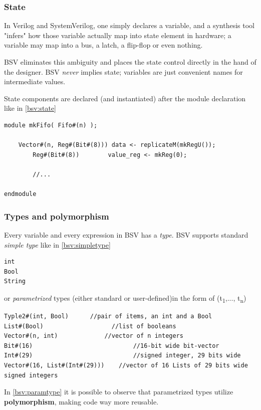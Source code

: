 \documentclass[12pt,oneside,a4paper]{article}
\begin{document}
\subsubsection{State}
In Verilog and SystemVerilog, one simply declares a variable, and a synthesis tool "infers" how those variable actually map into state element in hardware; a variable may map into a bus, a latch, a flip-flop or even nothing.

BSV eliminates this ambiguity and places the state control directly in the hand of the designer. BSV \textit{never} implies state; variables are just convenient names for intermediate values.

State components are declared (and instantiated) after the module declaration like in \cref{bsv:state}

\begin{lstlisting}[label={bsv:state},caption={Example of state declaration}]
module mkFifo( Fifo#(n) );

    Vector#(n, Reg#(Bit#(8))) data <- replicateM(mkRegU());
		Reg#(Bit#(8)) 	  	 value_reg <- mkReg(0);
		
		//...

endmodule
\end{lstlisting}

\subsubsection{Types and polymorphism}

Every variable and every expression in BSV has a \textit{type}.
BSV supports standard \textit{simple type} like in \cref{bsv:simpletype}
\begin{lstlisting}[label={bsv:simpletype},caption={Simple types}]
int
Bool
String
\end{lstlisting}
or \textit{parametrized} types (either standard or user-defined)in the form of {(t\textsubscript{1},..., t\textsubscript{n})}
\begin{lstlisting}[label={bsv:paramtype},caption={Parametrized types}]
Typle2#(int, Bool)		//pair of items, an int and a Bool
List#(Bool)					  //list of booleans
Vector#(n, int)				//vector of n integers
Bit#(16)							//16-bit wide bit-vector
Int#(29)							//signed integer, 29 bits wide
Vector#(16, List#(Int#(29)))	//vector of 16 Lists of 29 bits wide signed integers
\end{lstlisting}

In \cref{bsv:paramtype} it is possible to observe that parametrized types utilize \textbf{polymorphism}, making code way more reusable.
\end{document}
